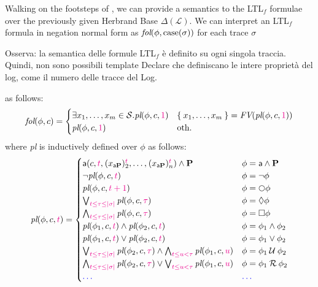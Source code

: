 Walking on the footsteps of \cite{GiacomoMM14}, we can provide a semantics to the LTL$_f$ formulae over the previously given Herbrand Base $\Delta(\mathcal{L})$. We can {\color{blue}interpret} an LTL$_f$ formula {\color{blue}in negation normal form} as $\textit{fol}(\phi,\textup{case}(\sigma))$ for each trace $\sigma$
\begin{UnknownEnvironment}
	\color{red}Osserva: la semantica delle formule LTL$_f$ è definito su ogni singola traccia. Quindi, non sono possibili template Declare che definiscano le intere proprietà del log, come il numero delle tracce del Log.
\end{UnknownEnvironment}
as follows:
\[\textit{fol}(\phi,c)=\begin{cases}
\exists x_1,\dots,x_m\in \mathcal{S}. \textit{pl}(\phi,c,{\color{magenta}1}) & \Set{x_1,\dots,x_m}=\textit{FV}(\textit{pl}(\phi,c,{\color{magenta}1}))\\
\textit{pl}(\phi,c,{\color{magenta}1}) & \textup{oth.}\\
\end{cases}\]
{\color{blue}where \textit{pl} is inductively defined over $\phi$ as follows:}
\[\textit{pl}(\phi,c,{\color{magenta}t})=\begin{cases}
\const{a}(c,{\color{magenta}t},\actsymb{({x_{\const{a}\mathbf{P}}})}{\color{black}2}[\color{magenta}t],\dots,\actsymb{({x_{\const{a}\mathbf{P}}})}{n}[\color{magenta}t])\wedge \mathbf{P}  &\phi=\const{a}\wedge \mathbf{P}\\

\neg \textit{pl}(\phi,c,{\color{magenta}t}) & \phi=\neg \phi\\
\textit{pl}(\phi,c,{\color{magenta}t+1}) & \phi=\Next \phi\\	 
\bigvee_{\color{magenta}t\leq\tau\leq|\sigma|}\textit{pl}(\phi,c,{\color{magenta}\tau}) & \phi=\lozenge\phi\\
\bigwedge_{\color{magenta}t\leq\tau\leq|\sigma|}\textit{pl}(\phi,c,{\color{magenta}\tau}) & \phi=\square\phi\\
\textit{pl}(\phi_1,c,{\color{magenta}t})\wedge \textit{pl}(\phi_2,c,{\color{magenta}t}) & \phi= \phi_1\wedge \phi_2\\
\textit{pl}(\phi_1,c,{\color{magenta}t})\vee \textit{pl}(\phi_2,c,{\color{magenta}t}) & \phi= \phi_1\vee \phi_2\\
\bigvee_{\color{magenta}t\leq\tau\leq|\sigma|}\textit{pl}(\phi_2,c,{\color{magenta}\tau})\wedge\bigwedge_{\color{magenta}t\leq u<\tau}\textit{pl}(\phi_1,c,{\color{magenta}u}) & \phi= \phi_1\Until \phi_2\\

\bigwedge_{\color{magenta}t\leq\tau\leq|\sigma|}\textit{pl}(\phi_2,c,{\color{magenta}\tau})\vee\bigvee_{\color{magenta}t\leq u<\tau}\textit{pl}(\phi_1,c,{\color{magenta}u}) & \phi= \phi_1\Release \phi_2\\
{\color{blue}\dots} & {\color{blue}\dots} \\

\end{cases}\] 
